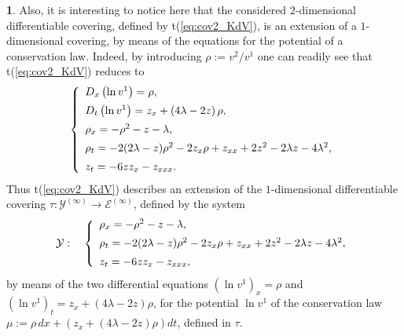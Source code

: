\documentclass[12pt,english]{elsarticle}
\theoremstyle{plain}
\theoremstyle{plain}
\theoremstyle{remark}
\theoremstyle{plain}
\theoremstyle{definition}
\theoremstyle{definition}
\newtheorem{example}[thm]{\protect\examplename}
\providecommand{\examplename}{Example}
\begin{document}
\begin{example}
Also, it is interesting to notice here that the considered $2$-dimensional
differentiable covering, defined by t{(\ref{eq:cov2_KdV})}, is an extension
of a $1$-dimensional covering, by means of the equations for the potential
of a conservation law. Indeed, by introducing $\rho :=v^{2}/v^{1}$ one
can readily see that t{(\ref{eq:cov2_KdV})} reduces to
%
\begin{equation*}
\left \{
%
\begin{array}{l}
D_{x}\left (\ln v^{1}\right )=\rho ,
\vspace{5pt}
\\
D_{t}\left (\ln v^{1}\right )=z_{x}+\left (4\lambda -2z\right )\rho ,
\vspace{5pt}
\\
\rho _{x}=-\rho ^{2}-z-\lambda ,
\vspace{5pt}
\\
\rho _{t}=-2(2\lambda -z)\rho ^{2}-2z_{x}\rho +z_{xx}+2z^{2}-2
\lambda z-4\lambda ^{2},
\vspace{5pt}
\\
z_{t}=-6zz_{x}-z_{xxx}.
\end{array}
%
\right .
\end{equation*}
%
Thus t{(\ref{eq:cov2_KdV})} describes an extension of the $1$-dimensional
differentiable covering
$\tau :\mathcal{Y}^{(\infty )}\longrightarrow \mathcal{E}^{(\infty )}$,
defined by the system
%
\begin{equation}
\mathcal{Y}:\quad \left \{
%
\begin{array}{l}
\rho _{x}=-\rho ^{2}-z-\lambda ,
\vspace{5pt}
\\
\rho _{t}=-2(2\lambda -z)\rho ^{2}-2z_{x}\rho +z_{xx}+2z^{2}-2
\lambda z-4\lambda ^{2},
\vspace{5pt}
\\
z_{t}=-6zz_{x}-z_{xxx},
\end{array}
%
\right .
\label{eq:cov3_KdV}
\end{equation}
%
by means of the two differential equations
$\left (\ln v^{1}\right )_{x}=\rho $ and
$\left (\ln v^{1}\right )_{t}=z_{x}+\left (4\lambda -2z\right )\rho $,
for the potential $\ln v^{1}$ of the conservation law
$\mu :=\rho \,dx+\left (z_{x}+\left (4\lambda -2z\right )\rho \right )dt$,
defined in $\tau $.
\end{example}
\end{document}
